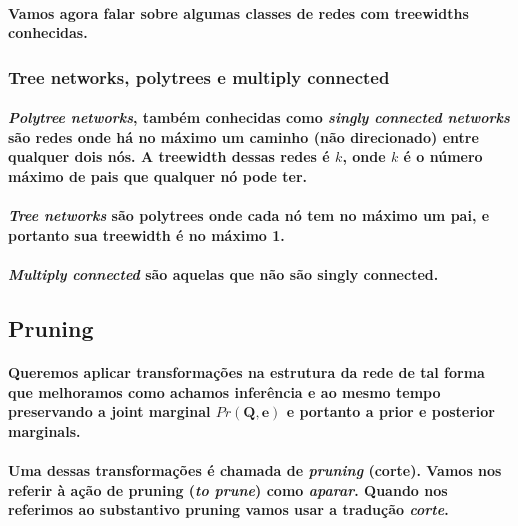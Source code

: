 \documentclass[a4paper,10pt]{article}
\theoremstyle{plain}
\begin{document}
\paragraph{
  Vamos agora falar sobre algumas classes de redes com treewidths conhecidas.
}

\subsubsection{Tree networks, polytrees e multiply connected}

\paragraph{
  \textit{Polytree networks}, também conhecidas como \textit{singly connected networks} são redes
  onde há no máximo um caminho (não direcionado) entre qualquer dois nós. A treewidth dessas redes
  é $k$, onde $k$ é o número máximo de pais que qualquer nó pode ter.
}

\paragraph{
  \textit{Tree networks} são polytrees onde cada nó tem no máximo um pai, e portanto sua treewidth
  é no máximo 1.
}

\paragraph{
  \textit{Multiply connected} são aquelas que não são singly connected.
}

\subsection{Pruning}

\paragraph{
  Queremos aplicar transformações na estrutura da rede de tal forma que melhoramos como achamos
  inferência e ao mesmo tempo preservando a joint marginal $Pr(\textbf{Q}, \textbf{e})$ e portanto
  a prior e posterior marginals.
}

\paragraph{
  Uma dessas transformações é chamada de \textit{pruning} (corte). Vamos nos referir à ação de 
  pruning (\textit{to prune}) como \textit{aparar}. Quando nos referimos ao substantivo pruning
  vamos usar a tradução \textit{corte}.
}
\end{document}
